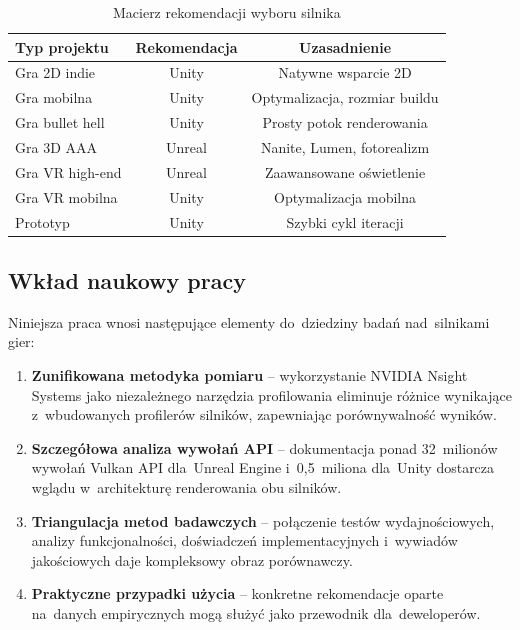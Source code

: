 \begin{table}[H]
\centering
\caption{Macierz rekomendacji wyboru silnika}
\label{tab:macierz-rekomendacji}
\begin{tabular}{|l|c|c|}
\hline
\textbf{Typ projektu} & \textbf{Rekomendacja} & \textbf{Uzasadnienie} \\
\hline
Gra 2D indie & Unity & Natywne wsparcie 2D \\
\hline
Gra mobilna & Unity & Optymalizacja, rozmiar buildu \\
\hline
Gra bullet hell & Unity & Prosty potok renderowania \\
\hline
Gra 3D AAA & Unreal & Nanite, Lumen, fotorealizm \\
\hline
Gra VR high-end & Unreal & Zaawansowane oświetlenie \\
\hline
Gra VR mobilna & Unity & Optymalizacja mobilna \\
\hline
Prototyp & Unity & Szybki cykl iteracji \\
\hline
\end{tabular}
\end{table}

\subsection{Wkład naukowy pracy}

Niniejsza praca wnosi następujące elementy do~dziedziny badań nad~silnikami gier:

\begin{enumerate}
    \item \textbf{Zunifikowana metodyka pomiaru} -- wykorzystanie NVIDIA Nsight Systems jako 
    niezależnego narzędzia profilowania eliminuje różnice wynikające z~wbudowanych profilerów 
    silników, zapewniając porównywalność wyników.

    \item \textbf{Szczegółowa analiza wywołań API} -- dokumentacja ponad 32~milionów wywołań 
    Vulkan API dla~Unreal Engine i~0,5~miliona dla~Unity dostarcza wglądu w~architekturę 
    renderowania obu silników.

    \item \textbf{Triangulacja metod badawczych} -- połączenie testów wydajnościowych, analizy 
    funkcjonalności, doświadczeń implementacyjnych i~wywiadów jakościowych daje kompleksowy 
    obraz porównawczy.

    \item \textbf{Praktyczne przypadki użycia} -- konkretne rekomendacje oparte na~danych empirycznych mogą służyć jako przewodnik dla~deweloperów.
\end{enumerate}

